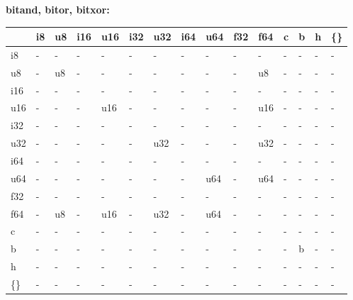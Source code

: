 \textbf{bitand, bitor, bitxor:}
\begin{scriptsize}\begin{tt}\begin{center}\vspace{-.3cm}\begin{tabular}{|m{.65cm}||m{.65cm}|m{.65cm}|m{.65cm}|m{.65cm}|m{.65cm}|m{.65cm}|m{.65cm}|m{.65cm}|m{.65cm}|m{.65cm}|m{.65cm}|m{.65cm}|m{.65cm}|m{.65cm}|}\hline 
&i8&u8&i16&u16&i32&u32&i64&u64&f32&f64&c&b&h&\{\}\\ \hline \hline
i8&-&-&-&-&-&-&-&-&-&-&-&-&-&-\\ \hline
u8&-&u8&-&-&-&-&-&-&-&u8&-&-&-&-\\ \hline
i16&-&-&-&-&-&-&-&-&-&-&-&-&-&-\\ \hline
u16&-&-&-&u16&-&-&-&-&-&u16&-&-&-&-\\ \hline
i32&-&-&-&-&-&-&-&-&-&-&-&-&-&-\\ \hline
u32&-&-&-&-&-&u32&-&-&-&u32&-&-&-&-\\ \hline
i64&-&-&-&-&-&-&-&-&-&-&-&-&-&-\\ \hline
u64&-&-&-&-&-&-&-&u64&-&u64&-&-&-&-\\ \hline
f32&-&-&-&-&-&-&-&-&-&-&-&-&-&-\\ \hline
f64&-&u8&-&u16&-&u32&-&u64&-&-&-&-&-&-\\ \hline
c&-&-&-&-&-&-&-&-&-&-&-&-&-&-\\ \hline
b&-&-&-&-&-&-&-&-&-&-&-&b&-&-\\ \hline
h&-&-&-&-&-&-&-&-&-&-&-&-&-&-\\ \hline
\{\}&-&-&-&-&-&-&-&-&-&-&-&-&-&-\\ \hline
\end{tabular}\end{center}\end{tt}\end{scriptsize} 

